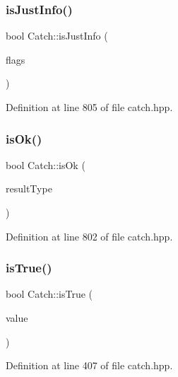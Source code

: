 \subsubsection{\texorpdfstring{is\+Just\+Info()}{isJustInfo()}}
{\footnotesize\ttfamily bool Catch\+::is\+Just\+Info (\begin{DoxyParamCaption}\item[{int}]{flags }\end{DoxyParamCaption})\hspace{0.3cm}{\ttfamily [inline]}}



Definition at line 805 of file catch.\+hpp.

\hypertarget{namespace_catch_a5205869c81c06d3460759cb86676ae68}{}\label{namespace_catch_a5205869c81c06d3460759cb86676ae68} 
\subsubsection{\texorpdfstring{is\+Ok()}{isOk()}}
{\footnotesize\ttfamily bool Catch\+::is\+Ok (\begin{DoxyParamCaption}\item[{\hyperlink{struct_catch_1_1_result_was_a624e1ee3661fcf6094ceef1f654601ef}{Result\+Was\+::\+Of\+Type}}]{result\+Type }\end{DoxyParamCaption})\hspace{0.3cm}{\ttfamily [inline]}}



Definition at line 802 of file catch.\+hpp.

\hypertarget{namespace_catch_ae3bc6c6677e64e6eaa720dc3add31852}{}\label{namespace_catch_ae3bc6c6677e64e6eaa720dc3add31852} 
\subsubsection{\texorpdfstring{is\+True()}{isTrue()}}
{\footnotesize\ttfamily bool Catch\+::is\+True (\begin{DoxyParamCaption}\item[{bool}]{value }\end{DoxyParamCaption})\hspace{0.3cm}{\ttfamily [inline]}}



Definition at line 407 of file catch.\+hpp.

